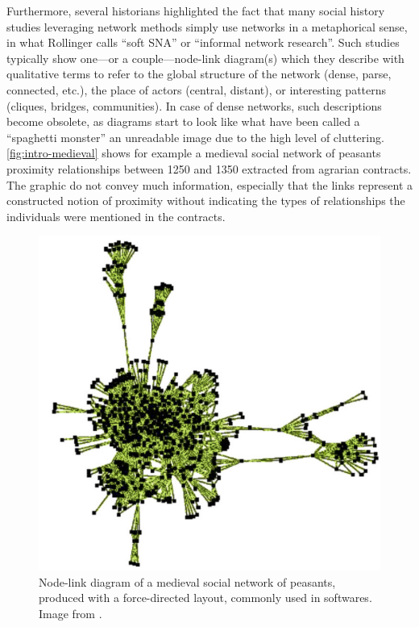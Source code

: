 Furthermore, several historians highlighted the fact that many social history studies leveraging network methods simply use networks in a metaphorical sense, in what Rollinger calls ``soft SNA'' or ``informal network research''\cite{rollingerProlegomenaProblemsPerspectives2020}.
Such studies typically show one---or a couple---node-link diagram(s) which they describe with qualitative terms\cite{lemercierQuantitativeMethodsHumanities2019} to refer to the global structure of the network (dense, parse, connected, etc.), the place of actors (central, distant), or interesting patterns (cliques, bridges, communities).
In case of dense networks, such descriptions become obsolete, as diagrams start to look like what have been called a ``spaghetti monster''\cite{collarNetworksArchaeologyPhenomena2015, lemercierQuantitativeMethodsHumanities2019} \ie an unreadable image due to the high level of cluttering.
\autoref{fig:intro-medieval} shows for example a medieval social network of peasants proximity relationships between 1250 and 1350 extracted from agrarian contracts.
The graphic do not convey much information, especially that the links represent a constructed notion of proximity without indicating the types of relationships the individuals were mentioned in the contracts.

\begin{figure}[!ht]
    \centering %
    \includegraphics[width=1\textwidth]{static/figures/RelatedWork/medievalNetwork}
    \caption{Node-link diagram of a medieval social network of peasants, produced with a force-directed layout, commonly used in \sna softwares. Image from \cite{bouletBatchKernelSOM2008}.}
    \label{fig:intro-medieval}
\end{figure}

